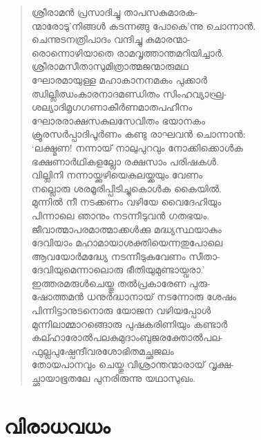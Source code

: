 \begin{verse}
ശ്രീരാമന്‍ പ്രസാദിച്ചു താപസകുമാരക-\\
ന്മാരോടു’നിങ്ങള്‍ കടന്നങ്ങു പോകെ’ന്നു ചൊന്നാന്‍.\\
ചെന്നുടനത്രിപാദം വന്ദിച്ചു കുമാരന്മാ-\\
രൊന്നൊഴിയാതെ രാമവൃത്താന്തമറിയിച്ചാര്‍.\\
ശ്രീരാമസീതാസുമിത്രാത്മജന്മാരുമഥ\\
ഘോരമായുള്ള മഹാകാനനമകം പുക്കാര്‍\\
ഝില്ലിഝംകാരനാദമണ്ഡിതം സിംഹവ്യാഘ്ര-\\
ശല്യാദിമൃഗഗണാകീര്‍ണമാതപഹീനം\\
ഘോരരാക്ഷസകുലസേവിതം ഭയാനകം\\
ക്രൂരസര്‍പ്പാദിപൂര്‍ണം കണ്ടു രാഘവന്‍ ചൊന്നാന്‍:\\
‘ലക്ഷ്മണ! നന്നായ് നാലുപുറവും നോക്കിക്കൊള്‍ക\\
ഭക്ഷണാര്‍ഥികളല്ലോ രക്ഷസാം പരിഷകള്‍.\\
വില്ലിനി നന്നായ്ക്കുഴിയെകുലയ്ക്കയും വേണം\\
നല്ലൊരു ശരമൂരിപ്പിടിച്ചുകൊള്‍ക കൈയില്‍.\\
മുന്നില്‍ നീ നടക്കണം വഴിയേ വൈദേഹിയും\\
പിന്നാലെ ഞാനും നടന്നീടുവന്‍ ഗതഭയം.\\
ജീവാത്മാപരമാത്മാക്കള്‍ക്കു മദ്ധ്യസ്ഥയാകും\\
ദേവിയാം മഹാമായാശക്തിയെന്നതുപോലെ\\
ആവയോര്‍മദ്ധ്യേ നടന്നീടുകവേണം സീതാ-\\
ദേവിയുമെന്നാലൊരു ഭീതിയുമുണ്ടായ്വരാ.’\\
ഇത്തരമരുള്‍ചെയ്തു തല്‍പ്രകാരേണ പുരു-\\
ഷോത്തമന്‍ ധനുര്‍ദ്ധാനായ് നടന്നോരു ശേഷം\\
പിന്നിട്ടാനുടനൊരു യോജന വഴിയപ്പോള്‍\\
മുന്നിലാമ്മാറങ്ങൊരു പുഷകരിണിയും കണ്ടാര്‍\\
കല്ഹാരോല്‍പലകുമുദാംബുജരക്തോല്‍പല-\\
ഫുല്ലപുഷ്പേന്ദീവരശോഭിതമച്ഛജലം\\
തോയപാനവും ചെയ്തു വിശ്രാന്തന്മാരായ് വൃക്ഷ-\\
ച്ഛായാഭൂതലേ പുനരിരുന്നു യഥാസുഖം.
\end{verse}

\section{വിരാധവധം}

